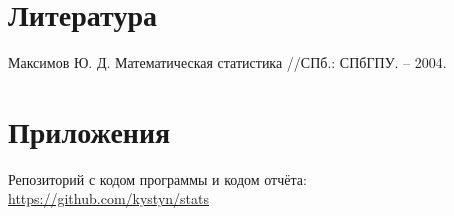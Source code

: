 \section{Литература}
Максимов Ю. Д. Математическая статистика //СПб.: СПбГПУ. – 2004.

\section{Приложения}

Репозиторий с кодом программы и кодом отчёта: \href{https://github.com/kystyn/stats}{https://github.com/kystyn/stats}



